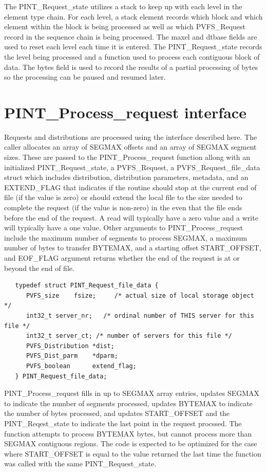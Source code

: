 \documentclass[12pt]{article} %
\begin{document}
The PINT\_Request\_state utilizes a stack to keep up with each level in the
element type chain.  For each level, a stack element records which block
and which element within the block is being processed as well as which
PVFS\_Request record in the sequence chain is being processed.  The
maxel and dtbase fields are used to reset each level each time it is
entered.  The PINT\_Request\_state records the level being processed
and a function used to process each contiguous block of data.  The bytes
field is used to record the results of a partial processing of bytes so
the processing can be paused and resumed later.

\section{PINT\_Process\_request interface}

Requests and distributions are processed using the interface described
here.  The caller allocates an array of SEGMAX offsets and an array of
SEGMAX segment sizes.  These are passed to the PINT\_Process\_request function
allong with an initialized PINT\_Request\_state, a PVFS\_Request, a
PVFS\_Request\_file\_data struct which includes distribution, distribution
parameters, metadata, and an EXTEND\_FLAG that indicates if the routine
should stop at the current end of file (if the value is zero) or should
extend the local file to the size needed to complete the request (if the
value is non-zero) in the even that the file ends before the end of the
request. A read will typically have a zero value and a write will
typically have a one value.  Other arguments to PINT\_Process\_request
include the maximum number of segments to process SEGMAX,
a maximum number of bytes to transfer BYTEMAX,
and a starting offset START\_OFFSET, and EOF\_FLAG argument returns
whether the end of the request is at or beyond the end of file.

\begin{verbatim}
   typedef struct PINT_Request_file_data {
      PVFS_size    fsize;     /* actual size of local storage object */
      int32_t server_nr;   /* ordinal number of THIS server for this file */
      int32_t server_ct; /* number of servers for this file */
      PVFS_Distribution *dist;
      PVFS_Dist_parm    *dparm;
      PVFS_boolean      extend_flag;
   } PINT_Request_file_data;
\end{verbatim}

PINT\_Process\_request fills in up to SEGMAX array entries, updates
SEGMAX to indicate the number of segments processed, updates BYTEMAX
to indicate the number of bytes processed, and updates START\_OFFSET and the
PINT\_Reqest\_state to indicate the last point in the request procssed.
The function attempts to process BYTEMAX bytes, but cannot process more
than SEGMAX contiguous regions.  The code is expected to be optimized
for the case where START\_OFFSET is equal to the value returned the last time
the function was called with the same PINT\_Request\_state.
\end{document}
